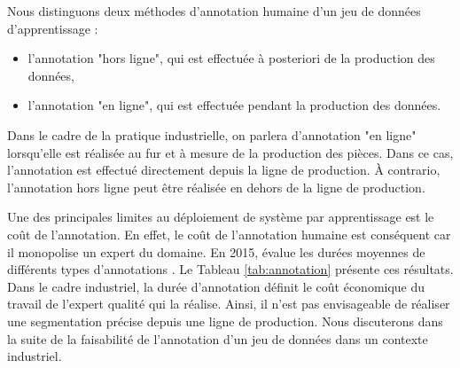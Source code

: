 Nous distinguons deux méthodes d'annotation humaine d'un jeu de données d'apprentissage :
\begin{itemize}
    \item l'annotation "hors ligne", qui est effectuée à posteriori de la production des données,
    \item l'annotation "en ligne", qui est effectuée pendant la production des données.
\end{itemize}
Dans le cadre de la pratique industrielle, on parlera d'annotation "en ligne" lorsqu'elle est réalisée au fur et à mesure de la production des pièces.
Dans ce cas, l'annotation est effectué directement depuis la ligne de production.
À contrario, l'annotation hors ligne peut être réalisée en dehors de la ligne de production.

Une des principales limites au déploiement de système par apprentissage est le coût de l'annotation.
En effet, le coût de l'annotation humaine est conséquent car il monopolise un expert du domaine.
En 2015, \citeauthor{bearman_what_2015} évalue les durées moyennes de différents types d'annotations \cite{bearman_what_2015}.
Le Tableau \ref{tab:annotation} présente ces résultats.
Dans le cadre industriel, la durée d'annotation définit le coût économique du travail de l'expert qualité qui la réalise.
Ainsi, il n'est pas envisageable de réaliser une segmentation précise depuis une ligne de production.
Nous discuterons dans la suite de la faisabilité de l'annotation d'un jeu de données dans un contexte industriel.

